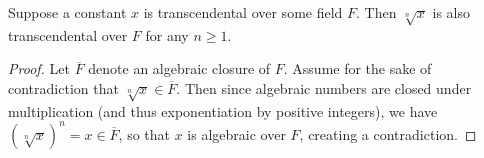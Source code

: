 \documentclass[12pt]{article}
\begin{document}
Suppose a constant $x$ is transcendental over some field $F$. Then $\sqrt[n]{x}$ is also transcendental over $F$ for any $n\geq 1$. 

\begin{proof}
Let $\overline{F}$ denote an algebraic closure of $F$.  Assume for the sake of contradiction that $\sqrt[n]{x}\in\overline{F}$.  Then since algebraic numbers are closed under multiplication (and thus exponentiation by positive integers), we have $(\sqrt[n]{x})^n=x\in \overline{F}$, so that $x$ is algebraic over $F$, creating a contradiction.
\end{proof}
\end{document}
